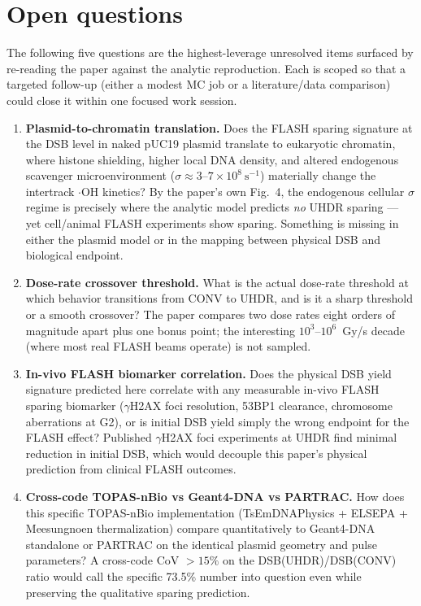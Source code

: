 \section{Open questions}\label{sec:openq}

The following five questions are the highest-leverage unresolved items surfaced
by re-reading the paper against the analytic reproduction. Each is scoped so
that a targeted follow-up (either a modest MC job or a literature/data
comparison) could close it within one focused work session.

\begin{enumerate}
  \item \textbf{Plasmid-to-chromatin translation.} Does the FLASH sparing
        signature at the DSB level in naked pUC19 plasmid translate to
        eukaryotic chromatin, where histone shielding, higher local DNA
        density, and altered endogenous scavenger microenvironment
        ($\sigma\!\approx\!3$--$7\!\times\!10^{8}\ \mathrm{s^{-1}}$) materially
        change the intertrack $\cdot$OH kinetics? By the paper's own Fig.~4,
        the endogenous cellular $\sigma$ regime is precisely where the
        analytic model predicts \emph{no} UHDR sparing --- yet cell/animal
        FLASH experiments show sparing. Something is missing in either the
        plasmid model or in the mapping between physical DSB and biological
        endpoint.

  \item \textbf{Dose-rate crossover threshold.} What is the actual dose-rate
        threshold at which behavior transitions from CONV to UHDR, and is it
        a sharp threshold or a smooth crossover? The paper compares two dose
        rates eight orders of magnitude apart plus one bonus point; the
        interesting $10^{3}$--$10^{6}$~Gy/s decade (where most real FLASH
        beams operate) is not sampled.

  \item \textbf{In-vivo FLASH biomarker correlation.} Does the physical DSB
        yield signature predicted here correlate with any measurable in-vivo
        FLASH sparing biomarker ($\gamma$H2AX foci resolution, 53BP1 clearance,
        chromosome aberrations at G2), or is initial DSB yield simply the
        wrong endpoint for the FLASH effect? Published $\gamma$H2AX foci
        experiments at UHDR find minimal reduction in initial DSB, which
        would decouple this paper's physical prediction from clinical FLASH
        outcomes.

  \item \textbf{Cross-code TOPAS-nBio vs Geant4-DNA vs PARTRAC.} How does
        this specific TOPAS-nBio implementation (TsEmDNAPhysics + ELSEPA +
        Meesungnoen thermalization) compare quantitatively to Geant4-DNA
        standalone or PARTRAC on the identical plasmid geometry and pulse
        parameters? A cross-code CoV $>15\%$ on the DSB(UHDR)/DSB(CONV) ratio
        would call the specific 73.5\% number into question even while
        preserving the qualitative sparing prediction.


\end{enumerate}
